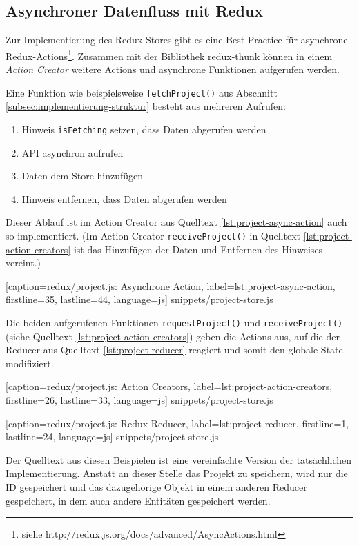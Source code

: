 \subsection{Asynchroner Datenfluss mit Redux}

Zur Implementierung des Redux Stores gibt es eine Best Practice für asynchrone Redux-Actions\footnote{siehe http://redux.js.org/docs/advanced/AsyncActions.html}. Zusammen mit der Bibliothek redux-thunk können in einem \emph{Action Creator} weitere Actions und asynchrone Funktionen aufgerufen werden.

Eine Funktion wie beispielsweise \texttt{fetchProject()} aus Abschnitt \ref{subsec:implementierung-struktur} besteht aus mehreren Aufrufen:

\begin{enumerate}
 \item Hinweis \texttt{isFetching} setzen, dass Daten abgerufen werden
 \item API asynchron aufrufen
 \item Daten dem Store hinzufügen
 \item Hinweis entfernen, dass Daten abgerufen werden
\end{enumerate}

Dieser Ablauf ist im Action Creator aus Quelltext \ref{lst:project-async-action} auch so implementiert. (Im Action Creator \texttt{receiveProject()} in Quelltext \ref{lst:project-action-creators} ist das Hinzufügen der Daten und Entfernen des Hinweises vereint.)


  [caption={redux/project.js: Asynchrone Action},
  label={lst:project-async-action},
  firstline=35,
  lastline=44,
  language=js]
  {snippets/project-store.js}

Die beiden aufgerufenen Funktionen \texttt{requestProject()} und \texttt{receiveProject()} (siehe Quelltext \ref{lst:project-action-creators}) geben die Actions aus, auf die der Reducer aus Quelltext \ref{lst:project-reducer} reagiert und somit den globale State modifiziert.


  [caption={redux/project.js: Action Creators},
  label={lst:project-action-creators},
  firstline=26,
  lastline=33,
  language=js]
  {snippets/project-store.js}


  [caption={redux/project.js: Redux Reducer},
  label={lst:project-reducer},
  firstline=1,
  lastline=24,
  language=js]
  {snippets/project-store.js}

Der Quelltext aus diesen Beispielen ist eine vereinfachte Version der tat\-säch\-lich\-en Implementierung. Anstatt an dieser Stelle das Projekt zu speichern, wird nur die ID gespeichert und das dazugehörige Objekt in einem anderen Reducer gespeichert, in dem auch andere Entitäten gespeichert werden.


